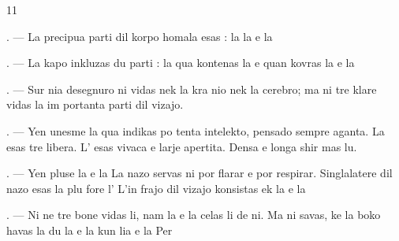 \begin{VUpage}[13]{11}
\VUsaut{4.0mm}
\VUsaut{2.0mm}
\VUsaut{2.4mm}
\VUsaut{3.0mm}

\VUsaut{3.0mm}

. --- La precipua parti dil korpo homala\nl
esas : la  la  e la 

. --- La kapo inkluzas du parti : la \nl
qua kontenas la  e quan kovras la \cc
{} e la 

. --- Sur nia desegnuro ni vidas nek la kra\cc
nio nek la cerebro; ma ni tre klare vidas la im\cc
portanta parti dil vizajo.

. --- Yen unesme la  qua indikas po\cc
tenta intelekto, pensado sempre aganta. La\nl
{} esas tre libera. L' esas vivaca e\nl
larje apertita. Densa  e longa  shir\cc
mas lu.

. --- Yen pluse la  e la  La nazo\nl
servas ni por flarar e por respirar. Singlalatere\nl
dil nazo esas la  plu fore l' L'in\cc
frajo dil vizajo konsistas ek la  e la \cc
{}

. --- Ni ne tre bone vidas li, nam la \cc
{} e la  celas li de ni. Ma ni\nl
savas, ke la boko havas la du  la \nl
e la  kun lia  e la  Per
\parplein
\end{VUpage}

